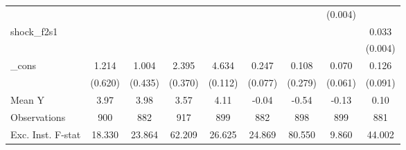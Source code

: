 {\begin{tabular}{l*{8}{c}}
            &                     &                     &                     &                     &                     &                     &     (0.004)         &                     \\
\addlinespace
shock\_f2s1  &                     &                     &                     &                     &                     &                     &                     &       0.033\sym{***}\\
            &                     &                     &                     &                     &                     &                     &                     &     (0.004)         \\
\addlinespace
\_cons      &       1.214\sym{*}  &       1.004\sym{**} &       2.395\sym{***}&       4.634\sym{***}&       0.247\sym{***}&       0.108         &       0.070         &       0.126         \\
            &     (0.620)         &     (0.435)         &     (0.370)         &     (0.112)         &     (0.077)         &     (0.279)         &     (0.061)         &     (0.091)         \\
\midrule
Mean Y      &        3.97         &        3.98         &        3.57         &        4.11         &       -0.04         &       -0.54         &       -0.13         &        0.10         \\
Observations&         900         &         882         &         917         &         899         &         882         &         898         &         899         &         881         \\
Exc. Inst. F-stat&      18.330         &      23.864         &      62.209         &      26.625         &      24.869         &      80.550         &       9.860         &      44.002         \\
\bottomrule
\end{tabular}
}
